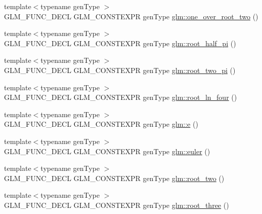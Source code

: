 \begin{DoxyCompactItemize}
\item 
{\footnotesize template$<$typename gen\-Type $>$ }\\G\-L\-M\-\_\-\-F\-U\-N\-C\-\_\-\-D\-E\-C\-L G\-L\-M\-\_\-\-C\-O\-N\-S\-T\-E\-X\-P\-R gen\-Type \hyperlink{group__gtc__constants_ga788fa23a0939bac4d1d0205fb4f35818}{glm\-::one\-\_\-over\-\_\-root\-\_\-two} ()
\item 
{\footnotesize template$<$typename gen\-Type $>$ }\\G\-L\-M\-\_\-\-F\-U\-N\-C\-\_\-\-D\-E\-C\-L G\-L\-M\-\_\-\-C\-O\-N\-S\-T\-E\-X\-P\-R gen\-Type \hyperlink{group__gtc__constants_ga4e276cb823cc5e612d4f89ed99c75039}{glm\-::root\-\_\-half\-\_\-pi} ()
\item 
{\footnotesize template$<$typename gen\-Type $>$ }\\G\-L\-M\-\_\-\-F\-U\-N\-C\-\_\-\-D\-E\-C\-L G\-L\-M\-\_\-\-C\-O\-N\-S\-T\-E\-X\-P\-R gen\-Type \hyperlink{group__gtc__constants_ga2bcedc575039fe0cd765742f8bbb0bd3}{glm\-::root\-\_\-two\-\_\-pi} ()
\item 
{\footnotesize template$<$typename gen\-Type $>$ }\\G\-L\-M\-\_\-\-F\-U\-N\-C\-\_\-\-D\-E\-C\-L G\-L\-M\-\_\-\-C\-O\-N\-S\-T\-E\-X\-P\-R gen\-Type \hyperlink{group__gtc__constants_ga4129412e96b33707a77c1a07652e23e2}{glm\-::root\-\_\-ln\-\_\-four} ()
\item 
{\footnotesize template$<$typename gen\-Type $>$ }\\G\-L\-M\-\_\-\-F\-U\-N\-C\-\_\-\-D\-E\-C\-L G\-L\-M\-\_\-\-C\-O\-N\-S\-T\-E\-X\-P\-R gen\-Type \hyperlink{group__gtc__constants_ga4b7956eb6e2fbedfc7cf2e46e85c5139}{glm\-::e} ()
\item 
{\footnotesize template$<$typename gen\-Type $>$ }\\G\-L\-M\-\_\-\-F\-U\-N\-C\-\_\-\-D\-E\-C\-L G\-L\-M\-\_\-\-C\-O\-N\-S\-T\-E\-X\-P\-R gen\-Type \hyperlink{group__gtc__constants_gad8fe2e6f90bce9d829e9723b649fbd42}{glm\-::euler} ()
\item 
{\footnotesize template$<$typename gen\-Type $>$ }\\G\-L\-M\-\_\-\-F\-U\-N\-C\-\_\-\-D\-E\-C\-L G\-L\-M\-\_\-\-C\-O\-N\-S\-T\-E\-X\-P\-R gen\-Type \hyperlink{group__gtc__constants_ga74e607d29020f100c0d0dc46ce2ca950}{glm\-::root\-\_\-two} ()
\item 
{\footnotesize template$<$typename gen\-Type $>$ }\\G\-L\-M\-\_\-\-F\-U\-N\-C\-\_\-\-D\-E\-C\-L G\-L\-M\-\_\-\-C\-O\-N\-S\-T\-E\-X\-P\-R gen\-Type \hyperlink{group__gtc__constants_ga4f286be4abe88be1eed7d2a9f6cb193e}{glm\-::root\-\_\-three} ()

\end{DoxyCompactItemize}
